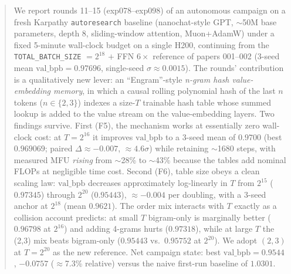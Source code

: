 \documentclass{article}
\newcommand{\valbpb}{\mathrm{val\_bpb}}
\begin{document}

\printAffiliationsAndNotice{}

\begin{abstract}
We report rounds 11--15 (exp078--exp098) of an autonomous campaign on a fresh Karpathy \texttt{autoresearch} baseline (nanochat-style GPT, $\sim$50M base parameters, depth 8, sliding-window attention, Muon+AdamW) under a fixed 5-minute wall-clock budget on a single H200, continuing from the \texttt{TOTAL\_BATCH\_SIZE} $=2^{18}$ $+$ FFN $6\times$ reference of papers 001--002 (3-seed mean $\valbpb = 0.97696$, single-seed $\sigma \approx 0.0015$). The rounds' contribution is a qualitatively new lever: an ``Engram''-style \emph{n-gram hash value-embedding memory}, in which a causal rolling polynomial hash of the last $n$ tokens ($n \in \{2,3\}$) indexes a size-$T$ trainable hash table whose summed lookup is added to the value stream on the value-embedding layers. Two findings survive. First (F5), the mechanism works at essentially zero wall-clock cost: at $T = 2^{16}$ it improves $\valbpb$ to a 3-seed mean of $0.9700$ (best $0.969069$; paired $\Delta \approx -0.007$, $\approx 4.6\sigma$) while retaining $\sim$1680 steps, with measured MFU \emph{rising} from $\sim$28\% to $\sim$43\% because the tables add nominal FLOPs at negligible time cost. Second (F6), table size obeys a clean scaling law: $\valbpb$ decreases approximately log-linearly in $T$ from $2^{15}$ ($0.97345$) through $2^{20}$ ($0.95443$), $\approx -0.004$ per doubling, with a 3-seed anchor at $2^{18}$ (mean $0.9621$). The order mix interacts with $T$ exactly as a collision account predicts: at small $T$ bigram-only is marginally better ($0.96798$ at $2^{16}$) and adding 4-grams hurts ($0.97318$), while at large $T$ the (2,3) mix beats bigram-only ($0.95443$ vs.\ $0.95752$ at $2^{20}$). We adopt $(2,3)$ at $T = 2^{20}$ as the new reference. Net campaign state: best $\valbpb = 0.9544$, $-0.0757$ ($\approx$7.3\% relative) versus the naive first-run baseline of $1.0301$.
\end{abstract}
\end{document}
